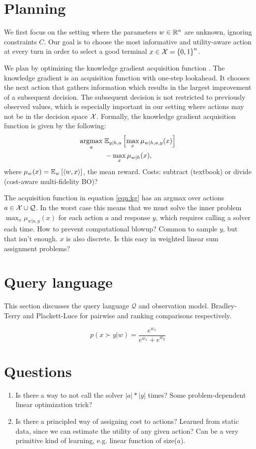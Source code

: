 \documentclass{article}
\theoremstyle{plain}
\theoremstyle{definition}
\theoremstyle{remark}
\begin{document}
\section{Planning}
We first focus on the setting where the parameters $w\in\mathbb{R}^n$ are unknown, ignoring constraints $C$.
Our goal is to choose the most informative and utility-aware action at every turn in order to select a good terminal $x\in\mathcal{X} = \left\{0,1\right\}^n$.

We plan by optimizing the knowledge gradient acquisition function \citep{kg}.
The knowledge gradient is an acquisition function with one-step lookahead.
It chooses the next action that gathers information which results in the largest improvement of a subsequent decision.
The subsequent decision is not restricted to previously observed values,
which is especially important in our setting where actions may not be in the decision space $\mathcal{X}$.
Formally, the knowledge gradient acquisition function is given by the following:
\begin{equation}
\label{eqn:kg}
\begin{aligned}
\operatorname*{argmax}_a \; & \mathbb{E}_{y|h,a}\left[\max_x \mu_{w|h,a,y}(x)\right]\\
&- \max_{x} \mu_{w|h}(x),
\end{aligned}
\end{equation}
where $\mu_w(x) = \mathbb{E}_{w}\left[\langle w,x \rangle\right]$, the mean reward.
Costs: subtract (textbook) or divide (cost-aware multi-fidelity BO)?

The acquisition function in equation \ref{eqn:kg} has an argmax over actions $a \in \mathcal{X} \cup \mathcal{Q}$.
In the worst case this means that we must solve the inner problem
$\max_x \mu_{w|a,y}(x)$ for each action $a$ and response $y$,
which requires calling a solver each time.
How to prevent computational blowup?
Common to sample $y$, but that isn't enough.
$x$ is also discrete. Is this easy in weighted linear sum assignment problems?

\section{Query language}
This section discusses the query language $\mathcal{Q}$ and observation model.
Bradley-Terry and Plackett-Luce for pairwise and ranking comparisons respectively.

\begin{equation}
p(x \succ y | w)= \frac{e^{w_x}}{e^{w_x} + e^{w_y}}
\end{equation}

\section{Questions}
\begin{enumerate}
    \item Is there a way to not call the solver $|a|*|y|$ times? Some problem-dependent linear optimization trick?
    \item Is there a principled way of assigning cost to actions? Learned from static data, since we can estimate the utility of any given action? Can be a very primitive kind of learning, e.g. linear function of size($a$).
\end{enumerate}
\end{document}
